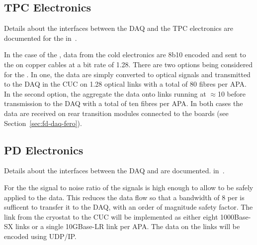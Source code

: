 
\subsection{TPC Electronics}
\label{sec:fd-daq-intfc-elec}

Details about the interfaces between the DAQ and the TPC electronics
are documented for the  
in~\cite{docdb-6742}.

In the case of the  , data from the cold
electronics  are 8b10 encoded and sent to the
 on copper cables at a bit rate of \SI{1.28}{\Gbps}. There
are two options being considered for the . In one, the
data are simply converted to optical signals and transmitted to the
DAQ in the CUC on \SI{1.28}{\Gbps} optical links with a total of 80
fibres per APA. In the second option, the  aggregate the
data onto links running at $\approx$\SI{10}{\Gbps} before transmission
to the DAQ with a total of ten fibres per APA. In both cases the data
are received on rear transition modules connected to the 
 boards (see Section~\ref{sec:fd-daq-fero}).


\subsection{PD Electronics}
\label{sec:fd-daq-intfc-photon}

Details about the interfaces between the DAQ and 
 are documented. in~\cite{docdb-6727}.


For the   the signal to noise ratio of the
 signals is high enough to allow  to be safely
applied to the data. This reduces the data flow so that a bandwidth of
\SI{8}{\Gbps} per  is sufficent to transfer it to the DAQ,
with an order of magnitude safety factor. The link from the 
cryostat to the CUC will be implemented as either eight 1000Base-SX
links or a single 10GBase-LR link per APA.
The data on the links will be encoded using UDP/IP.

